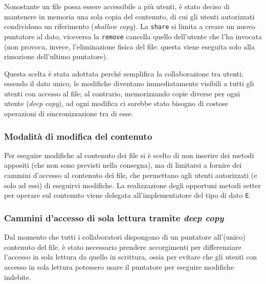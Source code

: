 \documentclass[a4paper,10pt]{article}
\begin{document}
 Nonostante un file possa essere accessibile a più utenti, è stato deciso di mantenere in memoria una sola copia del contenuto, di cui gli utenti autorizzati condividono un riferimento (\textit{shallow copy}). La \texttt{share} si limita a creare un nuovo puntatore al dato, viceversa la \texttt{remove} cancella quello dell'utente che l'ha invocata (non provoca, invece, l'eliminazione fisica del file: questa viene eseguita solo alla rimozione dell'ultimo puntatore).
 
 Questa scelta è stata adottata perché semplifica la collaborazione tra utenti: essendo il dato unico, le modifiche diventano immediatamente visibili a tutti gli utenti con accesso al file; al contrario, memorizzando copie diverse per ogni utente (\textit{deep copy}), ad ogni modifica ci sarebbe stato bisogno di costose operazioni di sincronizzazione tra di esse.

 \vspace{-0.3cm}
 \subsubsection*{ Modalità di modifica del contenuto }
 \vspace{-0.1cm}
 
 Per eseguire modifiche al contenuto dei file si è scelto di non inserire dei metodi appositi (che non sono previsti nella consegna), ma di limitarsi a fornire dei cammini d'accesso al contenuto dei file, che permettano agli utenti autorizzati (e solo ad essi) di eseguirvi modifiche. La realizzazione degli opportuni metodi setter per operare sul contenuto viene delegata all'implementatore del tipo di dato \texttt{E}.
 
 \vspace{-0.3cm}
 \subsubsection*{ Cammini d'accesso di sola lettura tramite \textit{deep copy} }
 \vspace{-0.1cm}
  
 Dal momento che tutti i collaboratori dispongono di un puntatore all'(unico) contenuto del file, è stato necessario prendere accorgimenti per differenziare l'accesso in sola lettura da quello in scrittura, ossia per evitare che gli utenti con accesso in sola lettura potessero usare il puntatore per eseguire modifiche indebite.
 
\end{document}
